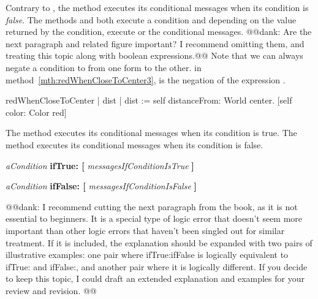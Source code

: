 {Contrary to , the method  executes its conditional messages when its condition is \emph{false}. The methods  and  both execute a condition and\add{,} depending on the value returned by the condition,  execute or  the conditional messages. \add{\paragraph
}
@@dank: Are the next paragraph and related figure important? I recommend omitting them, and treating this topic along with boolean expressions.@@
Note that we can always negate  a condition to  from one form to the other.  in method~\ref{mth:redWhenCloseToCenter3},  is the negation of the expression . 

\begin{method}\label{mth:redWhenCloseToCenter3}
redWhenCloseToCenter
   | dist | 
   dist := self distanceFrom: World  center.
       [self color: Color red]
\end{method}


The method  executes its conditional messages when its condition is true.
The method  executes its conditional messages when its condition is false.

\begin{nalltt}
\textit{aCondition}
      \textbf{ifTrue: [} \textit{messagesIfConditionIsTrue} \textbf{]}

\textit{aCondition}
      \textbf{ifFalse: [} \textit{messagesIfConditionIsFalse} \textbf{]}
\end{nalltt}

@@dank: I recommend cutting the next paragraph from the book, as it is not essential to beginners.  It is a special type of logic error that doesn't seem more important than other logic errors that haven't been singled out for similar treatment.  If it is included, the explanation should be expanded with two pairs of illustrative examples: one pair where ifTrue:ifFalse is logically equivalent to ifTrue: and ifFalse:, and another pair where it is logically different.  If you decide to keep this topic, I could draft an extended explanation and examples for your review and revision. @@
}
